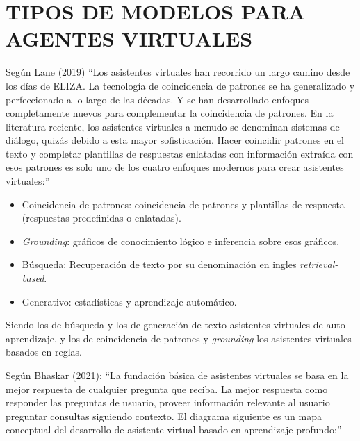 \documentclass[letter, openright, 12pt]{book}
\begin{document}
\section{TIPOS DE MODELOS PARA AGENTES VIRTUALES}
Según Lane (2019) “Los asistentes virtuales han recorrido un largo camino desde los días de ELIZA. La tecnología de coincidencia de patrones se ha generalizado y perfeccionado a lo largo de las décadas. Y se han desarrollado enfoques completamente nuevos para complementar la coincidencia de patrones. En la literatura reciente, los asistentes virtuales a menudo se denominan sistemas de diálogo, quizás debido a esta mayor sofisticación. Hacer coincidir patrones en el texto y completar plantillas de respuestas enlatadas con información extraída con esos patrones es solo uno de los cuatro enfoques modernos para crear asistentes virtuales:”

\begin{itemize}
\item Coincidencia de patrones: coincidencia de patrones y plantillas de respuesta (respuestas predefinidas o enlatadas).
\item \textit{Grounding}: gráficos de conocimiento lógico e inferencia sobre esos gráficos.
\item Búsqueda: Recuperación de texto por su denominación en ingles \textit{retrieval-based}.
\item Generativo: estadísticas y aprendizaje automático.
\end{itemize}

Siendo los de búsqueda y los de generación de texto asistentes virtuales de auto aprendizaje, y los de coincidencia de patrones y \textit{grounding } los asistentes virtuales basados en reglas.
\par
Según Bhaskar (2021): “La fundación básica de asistentes virtuales se basa en la mejor respuesta de cualquier pregunta que reciba. La mejor respuesta como responder las preguntas de usuario, proveer información relevante al usuario preguntar consultas siguiendo contexto. El diagrama siguiente es un mapa conceptual del desarrollo de asistente virtual basado en aprendizaje profundo:”
\end{document}
